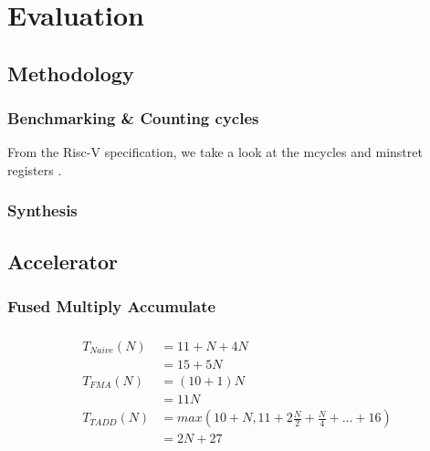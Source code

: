 \documentclass[a4paper,9pt]{report}
\begin{document}
\chapter{Evaluation} 
\section{Methodology}
\subsection{Benchmarking \& Counting cycles}
From the Risc-V specification, we take a look at the mcycles and minstret
registers
.
\subsection{Synthesis}

\section{Accelerator}
\subsection{Fused Multiply Accumulate}




\subsection{}

\begin{align*}
  T_{Naive}(N) &= 11+N + 4N \\
  &= 15 + 5N \\
  T_{FMA}(N) &= (10+1)N \\
             &= 11N \\
  T_{TADD}(N) &= max(10+N, 11+2\frac{N}{2} + \frac{N}{4} + ... + 16) \\
             &= 2N+27 
\end{align*}
\end{document}
